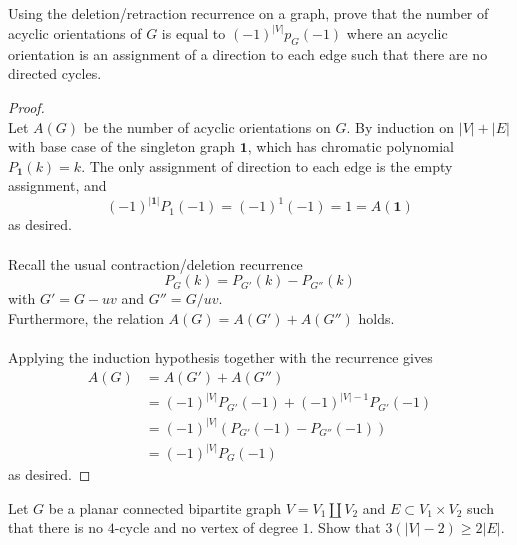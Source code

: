 \documentclass{article}
\newenvironment{problem}[2][Problem]{\begin{trivlist}
\item[\hskip \labelsep {\bfseries #1}\hskip \labelsep {\bfseries #2.}]}{\end{trivlist}}
\begin{document}
\pagebreak
\begin{problem}{3}
  Using the deletion/retraction recurrence on a graph, prove that the number of
  acyclic orientations of $G$ is equal to $(-1)^{|V|}p_G(-1)$ where an acyclic
  orientation is an assignment of a direction to each edge such that there are
  no directed cycles.
\end{problem}

\begin{proof} \text{} \\
  Let $A(G)$ be the number of acyclic orientations on $G$.
  By induction on $|V| + |E|$ with base case of the singleton graph $\mathbf 1$, which has
  chromatic polynomial $P_{\mathbf 1}(k) = k$.
  The only assignment of direction to each edge is the empty assignment, and
  \[
    (-1)^{|\mathbf 1|}P_1(-1) = (-1)^1(-1) = 1 = A(\mathbf 1)
  \] as desired.
  \\~\\
  Recall the usual contraction/deletion recurrence \[
    P_{G}(k) = P_{G'}(k) - P_{G''}(k)
  \] with $G' = G - uv$ and $G'' = G/uv$.
  \\
  Furthermore, the relation $A(G) = A(G') + A(G'')$ holds.
  \\~\\
  Applying the induction hypothesis together with the recurrence gives
  \begin{align*}
    A(G) &= A(G') + A(G'')\\
    &= (-1)^{|V|}P_{G'}(-1) + (-1)^{|V|-1}P_{G'}(-1) \\
    &=(-1)^{|V|}(P_{G'}(-1) - P_{G''}(-1)) \\
    &= (-1)^{|V|}P_G(-1)
  \end{align*} as desired.
\end{proof}
\pagebreak
\begin{problem}{4}
  Let $G$ be a planar connected bipartite graph $V = V_1 \coprod V_2$ and
  $E \subset V_1 \times V_2$ such that there is no $4$-cycle and no vertex of
  degree $1$. Show that $3(|V|-2) \geq 2|E|$.
\end{problem}
\end{document}
